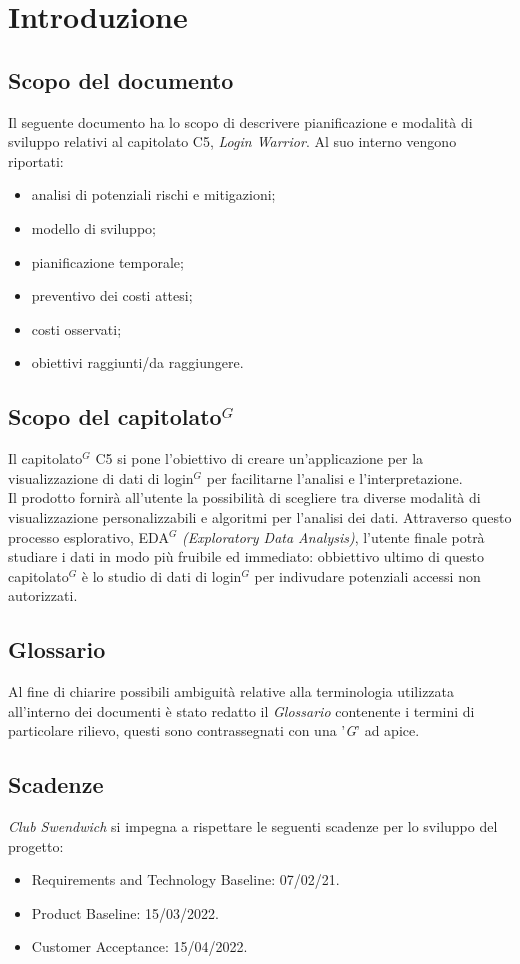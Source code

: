 \section{Introduzione}
\subsection{Scopo del documento}
Il seguente documento ha lo scopo di descrivere pianificazione e modalità di sviluppo relativi al capitolato C5, \textit{Login Warrior}.
Al suo interno vengono riportati:
\begin{itemize}
    \item analisi di potenziali rischi e mitigazioni;
    \item modello di sviluppo;
    \item pianificazione temporale;
    \item preventivo dei costi attesi;
    \item costi osservati;
    \item obiettivi raggiunti/da raggiungere.
\end{itemize}

\subsection{Scopo del capitolato$^G$ }
Il capitolato$^G$  C5 si pone l'obiettivo di creare un'applicazione per la visualizzazione di dati di login$^G$
per facilitarne l'analisi e l'interpretazione.\\
Il prodotto fornirà all'utente la possibilità di scegliere tra diverse
modalità di visualizzazione personalizzabili e algoritmi per l'analisi dei dati.
Attraverso questo processo esplorativo, EDA$^G$  \textit{(Exploratory Data Analysis)},
l'utente finale potrà studiare i dati in modo più fruibile ed immediato: obbiettivo ultimo
di questo capitolato$^G$  è lo studio di dati di login$^G$  per indivudare potenziali accessi non autorizzati.

\subsection{Glossario}
Al fine di chiarire possibili ambiguità relative alla terminologia utilizzata all'interno dei documenti è stato redatto il \textit{Glossario} contenente i termini di particolare rilievo,
questi sono contrassegnati con una '\textit{G}' ad apice.

\subsection{Scadenze}
\textit{Club Swendwich} si impegna a rispettare le seguenti scadenze per lo sviluppo del progetto:
\begin{itemize}
    \item Requirements and Technology Baseline: 07/02/21.
    \item Product Baseline: 15/03/2022.
    \item Customer Acceptance: 15/04/2022.
\end{itemize}